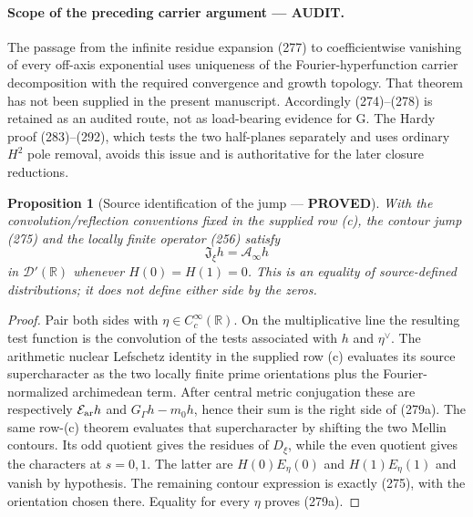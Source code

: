 \documentclass[11pt]{article}
\newtheorem{proposition}[theorem]{Proposition}
\newcommand{\PROVED}{\textcolor{green!45!black}{\textbf{PROVED}}}
\newcommand{\AUDIT}{\textcolor{orange!75!black}{\textbf{AUDIT}}}
\begin{document}
\paragraph{Scope of the preceding carrier argument --- \AUDIT.}
The passage from the infinite residue expansion (277) to coefficientwise
vanishing of every off-axis exponential uses uniqueness of the
Fourier-hyperfunction carrier decomposition with the required convergence
and growth topology.  That theorem has not been supplied in the present
manuscript.  Accordingly (274)--(278) is retained as an audited route, not
as load-bearing evidence for G.  The Hardy proof (283)--(292), which tests
the two half-planes separately and uses ordinary $H^2$ pole removal, avoids
this issue and is authoritative for the later closure reductions.

\begin{proposition}[Source identification of the jump --- \PROVED]
With the convolution/reflection conventions fixed in the supplied row (c),
the contour jump (275) and the locally finite operator (256) satisfy
\begin{equation}
 \boxed{\mathfrak J_\xi h=\mathcal A_\infty h}         \tag{279a}
\end{equation}
in $\mathcal D'(\mathbb R)$ whenever $H(0)=H(1)=0$.
This is an equality of source-defined distributions; it does not define
either side by the zeros.
\end{proposition}

\begin{proof}
Pair both sides with $\eta\in C_c^\infty(\mathbb R)$.  On the multiplicative
line the resulting test function is the convolution of the tests associated
with $h$ and $\eta^\vee$.  The arithmetic nuclear Lefschetz identity in the
supplied row (c) evaluates its source supercharacter as the two locally
finite prime orientations plus the Fourier-normalized archimedean term.
After central metric conjugation these are respectively
$\mathcal E_{\rm ar}h$ and $G_\Gamma h-m_0h$, hence their sum is the
right side of (279a).  The same row-(c) theorem evaluates that
supercharacter by shifting the two Mellin contours.  Its odd quotient gives
the residues of $D_\xi$, while the even quotient gives the characters at
$s=0,1$.  The latter are $H(0)E_\eta(0)$ and $H(1)E_\eta(1)$ and vanish by
hypothesis.  The remaining contour expression is exactly (275), with the
orientation chosen there.  Equality for every $\eta$ proves (279a).
\end{proof}
\end{document}
